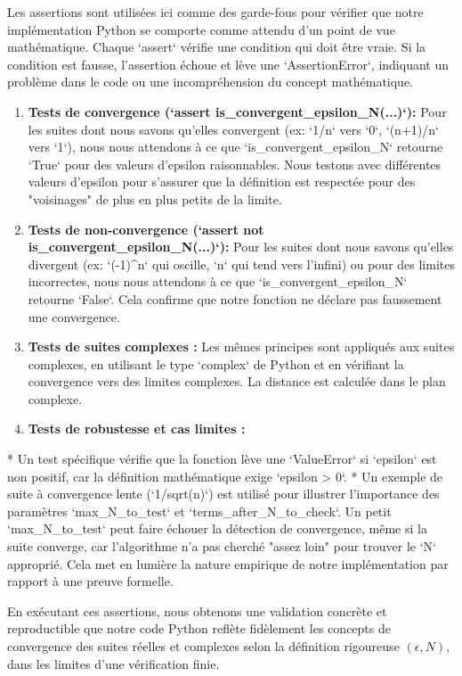 \documentclass[a4paper,11pt]{report}
\begin{document}
Les assertions sont utilisées ici comme des garde-fous pour vérifier que notre implémentation Python se comporte comme attendu d'un point de vue mathématique. Chaque `assert` vérifie une condition qui doit être vraie. Si la condition est fausse, l'assertion échoue et lève une `AssertionError`, indiquant un problème dans le code ou une incompréhension du concept mathématique.
\begin{enumerate}
\item \textbf{Tests de convergence (`assert is\_convergent\_epsilon\_N(...)`):} Pour les suites dont nous savons qu'elles convergent (ex: `1/n` vers `0`, `(n+1)/n` vers `1`), nous nous attendons à ce que `is\_convergent\_epsilon\_N` retourne `True` pour des valeurs d'epsilon raisonnables. Nous testons avec différentes valeurs d'epsilon pour s'assurer que la définition est respectée pour des "voisinages" de plus en plus petits de la limite.

\item \textbf{Tests de non-convergence (`assert not is\_convergent\_epsilon\_N(...)`):} Pour les suites dont nous savons qu'elles divergent (ex: `(-1)^n` qui oscille, `n` qui tend vers l'infini) ou pour des limites incorrectes, nous nous attendons à ce que `is\_convergent\_epsilon\_N` retourne `False`. Cela confirme que notre fonction ne déclare pas faussement une convergence.

\item \textbf{Tests de suites complexes :} Les mêmes principes sont appliqués aux suites complexes, en utilisant le type `complex` de Python et en vérifiant la convergence vers des limites complexes. La distance est calculée dans le plan complexe.

\item \textbf{Tests de robustesse et cas limites :}
\end{enumerate}
    *   Un test spécifique vérifie que la fonction lève une `ValueError` si `epsilon` est non positif, car la définition mathématique exige `epsilon > 0`.
    *   Un exemple de suite à convergence lente (`1/sqrt(n)`) est utilisé pour illustrer l'importance des paramètres `max\_N\_to\_test` et `terms\_after\_N\_to\_check`. Un petit `max\_N\_to\_test` peut faire échouer la détection de convergence, même si la suite converge, car l'algorithme n'a pas cherché "assez loin" pour trouver le `N` approprié. Cela met en lumière la nature empirique de notre implémentation par rapport à une preuve formelle.

En exécutant ces assertions, nous obtenons une validation concrète et reproductible que notre code Python reflète fidèlement les concepts de convergence des suites réelles et complexes selon la définition rigoureuse $(\epsilon, N)$, dans les limites d'une vérification finie.
\end{document}
